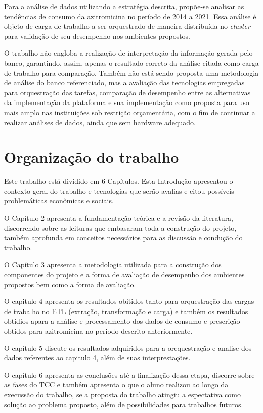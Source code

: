 Para a análise de dados utilizando a estratégia descrita, propõe-se analisar as tendências de consumo da azitromicina no período de 2014 a 2021. Essa análise é objeto de carga de trabalho a ser orquestrado de maneira distribuída no \emph{cluster} para validação de seu desempenho nos ambientes propostos.

O trabalho não engloba a realização de interpretação da informação gerada pelo banco, garantindo, assim, apenas o resultado correto da análise citada como carga de trabalho para comparação. Também não está sendo proposta uma metodologia de análise do banco referenciado, mas a avaliação das tecnologias empregadas para orquestração das tarefas, comparação de desempenho entre as alternativas da implementação da plataforma e sua implementação como proposta para uso mais amplo nas instituições sob restrição orçamentária, com o fim de continuar a realizar análises de dados, ainda que sem hardware adequado.


\section{Organização do trabalho}
\label{sec:organizacaoTrabalho}

Este trabalho está dividido em 6 Capítulos. Esta Introdução apresentou o contexto geral do trabalho e tecnologias que serão avalias e citou possíveis problemáticas econômicas e sociais. 

O Capítulo 2 apresenta a fundamentação teórica e a revisão da literatura, discorrendo sobre as leituras que embasaram toda a construção do projeto, também aprofunda em conceitos necessários para as discussão e condução do trabalho. 

O Capítulo 3 apresenta a  metodologia utilizada para a construção dos componentes do projeto e a forma de avaliação de desempenho dos ambientes propostos bem como a forma de avaliação. 

O capitulo 4 apresenta os resultados obitidos tanto para orquestração das cargas de trabalho no ETL (extração, transformação e carga) e também os resultados obtidios apara a análise e processamento dos dados de consumo e prescrição obtidos para azitromicina no periodo descrito anteriormente.

O capítulo 5 discute os resultados adquiridos para a orequestração e analise dos dados referentes ao capitulo 4, além de suas interprestações. 

O capítulo 6 apresenta as conclusões até a finalização dessa etapa, discorre sobre as fases do TCC e também apresenta o que o aluno realizou ao longo da execussão do trabalho, se a proposta do trabalho atingiu a espectativa como solução ao problema  proposto, além de possibilidades para trabalhos futuros. 
